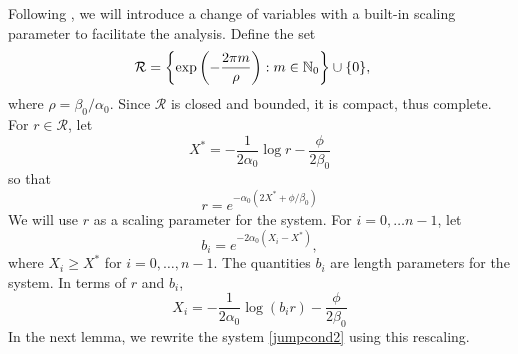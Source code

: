\documentclass[10pt,reqno]{amsart}
\theoremstyle{plain}
\theoremstyle{definition}
\theoremstyle{remark}
\numberwithin{theorem}{section}
\numberwithin{equation}{section}
\begin{document}
Following \cite[Section 6]{Sandstede1998}, we will introduce a change of variables with a built-in scaling parameter to facilitate the analysis. Define the set
\begin{align}
\mathcal{R} &= \left\{ \mathop\mathrm{exp}\nolimits\left(-\frac{2 \pi m}{\rho}\right) : m \in \mathbb{N}_0 \right\} \cup \{ 0 \},
\end{align}
where $\rho = \beta_0 / \alpha_0$. Since $\mathcal{R}$ is closed and bounded, it is compact, thus complete. For $r \in \mathcal{R}$, let
\begin{equation}\label{Xstar}
X^* = -\frac{1}{2\alpha_0}\log r - \frac{\phi}{2\beta_0}
\end{equation}
so that
\begin{equation}
r = e^{-\alpha_0(2X^* + \phi/\beta_0)}
\end{equation}
We will use $r$ as a scaling parameter for the system. For $i = 0, \dots n-1$, let
\begin{equation}\label{bjscale}
b_i = e^{-2 \alpha_0 (X_i - X^*)},
\end{equation}
where $X_i \geq X^*$ for $i = 0, \dots, n-1$. The quantities $b_i$ are length parameters for the system. In terms of $r$ and $b_i$,
\begin{equation}\label{Xiscale}
X_i = -\frac{1}{2\alpha_0}\log(b_i r) - \frac{\phi}{2 \beta_0}
\end{equation}
In the next lemma, we rewrite the system \eqref{jumpcond2} using this rescaling.
\end{document}
